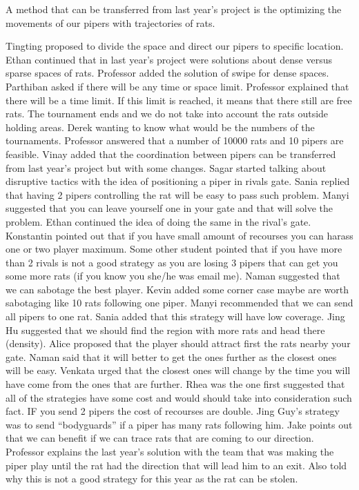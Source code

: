A method that can be transferred from last year’s project is the optimizing the movements of our pipers with trajectories of rats. 

Tingting proposed to divide the space and direct our pipers to specific location.
Ethan continued that in last year’s project were solutions about dense versus sparse spaces of rats. Professor added the solution of swipe for dense spaces.
Parthiban asked if there will be any time or space limit. Professor explained that there will be a time limit. If this limit is reached, it means that there still are free rats. The tournament ends and we do not take into account the rats outside holding areas.
Derek wanting to know what would be the numbers of the tournaments. Professor answered that a number of 10000 rats and 10 pipers are feasible. 
Vinay added that the coordination between pipers can be transferred from last year’s project but with some changes.
Sagar started talking about disruptive tactics with the idea of positioning a piper in rivals gate. Sania replied that having 2 pipers controlling the rat will be easy to pass such problem. Manyi suggested that you can leave yourself one in your gate and that will solve the problem. Ethan continued the idea of doing the same in the rival’s gate. Konstantin pointed out that if you have small amount of recourses you can harass one or two player maximum. Some other student pointed that if you have more than 2 rivals is not a good strategy as you are losing 3 pipers that can get you some more rats (if you know you she/he was email me).
Naman suggested that we can sabotage the best player. Kevin added some corner case maybe are worth sabotaging like 10 rats following one piper. 
Manyi recommended that we can send all pipers to one rat. Sania added that this strategy will have low coverage.
Jing Hu suggested that we should find the region with more rats and head there (density).
Alice proposed that the player should attract first the rats nearby your gate. Naman said that it will better to get the ones further as the closest ones will be easy. Venkata urged that the closest ones will change by the time you will have come from the ones that are further.
Rhea was the one first suggested that all of the strategies have some cost and would should take into consideration such fact. IF you send 2 pipers the cost of recourses are double.
Jing Guy’s strategy was to send “bodyguards” if a piper has many rats following him.
Jake points out that we can benefit if we can trace rats that are coming to our direction.
Professor explains the last year’s solution with the team that was making the piper play until the rat had the direction that will lead him to an exit. Also told why this is not a good strategy for this year as the rat can be stolen. 
